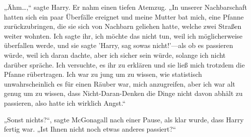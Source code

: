 „Ähm…,“ sagte Harry. Er nahm einen tiefen Atemzug. „In unserer Nachbarschaft hatten sich ein paar Überfälle ereignet und meine Mutter bat mich, eine Pfanne zurückzubringen, die sie sich von Nachbarn geliehen hatte, welche zwei Straßen weiter wohnten. Ich sagte ihr, ich möchte das nicht tun, weil ich möglicherweise überfallen werde, und sie sagte 'Harry, sag sowas nicht!'—als ob es passieren würde, weil ich daran dachte, aber ich sicher sein würde, solange ich nicht darüber spräche. Ich versuchte, es ihr zu erklären und sie ließ mich trotzdem die Pfanne rübertragen. Ich war zu jung um zu wissen, wie statistisch unwahrscheinlich es für einen Räuber war, mich anzugreifen, aber ich war alt genug um zu wissen, dass Nicht-Daran-Denken die Dinge nicht davon abhält zu passieren, also hatte ich wirklich Angst.“

„Sonst nichts?“, sagte McGonagall nach einer Pause, als klar wurde, dass Harry fertig war. „Ist Ihnen nicht noch etwas anderes passiert?“

